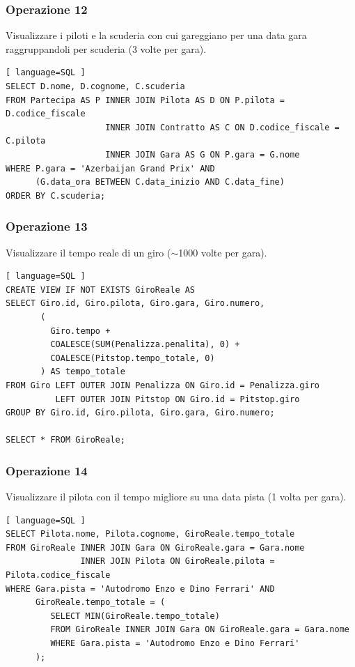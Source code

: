 \documentclass[11pt]{article}
\begin{document}
\subsubsection{Operazione 12}
Visualizzare i piloti e la scuderia con cui gareggiano per una data gara raggruppandoli per scuderia (3 volte per gara).
\begin{lstlisting}[ language=SQL ]
SELECT D.nome, D.cognome, C.scuderia
FROM Partecipa AS P INNER JOIN Pilota AS D ON P.pilota = D.codice_fiscale
                    INNER JOIN Contratto AS C ON D.codice_fiscale = C.pilota
                    INNER JOIN Gara AS G ON P.gara = G.nome
WHERE P.gara = 'Azerbaijan Grand Prix' AND
      (G.data_ora BETWEEN C.data_inizio AND C.data_fine)
ORDER BY C.scuderia;
\end{lstlisting}


\subsubsection{Operazione 13}
Visualizzare il tempo reale di un giro ($\sim$1000 volte per gara).
\begin{lstlisting}[ language=SQL ]
CREATE VIEW IF NOT EXISTS GiroReale AS
SELECT Giro.id, Giro.pilota, Giro.gara, Giro.numero, 
       (
         Giro.tempo + 
         COALESCE(SUM(Penalizza.penalita), 0) + 
         COALESCE(Pitstop.tempo_totale, 0)
       ) AS tempo_totale
FROM Giro LEFT OUTER JOIN Penalizza ON Giro.id = Penalizza.giro
          LEFT OUTER JOIN Pitstop ON Giro.id = Pitstop.giro
GROUP BY Giro.id, Giro.pilota, Giro.gara, Giro.numero;

SELECT * FROM GiroReale;
\end{lstlisting}


\subsubsection{Operazione 14}
Visualizzare il pilota con il tempo migliore su una data pista (1 volta per gara).
\begin{lstlisting}[ language=SQL ]
SELECT Pilota.nome, Pilota.cognome, GiroReale.tempo_totale
FROM GiroReale INNER JOIN Gara ON GiroReale.gara = Gara.nome
               INNER JOIN Pilota ON GiroReale.pilota = Pilota.codice_fiscale
WHERE Gara.pista = 'Autodromo Enzo e Dino Ferrari' AND
      GiroReale.tempo_totale = (
         SELECT MIN(GiroReale.tempo_totale)
         FROM GiroReale INNER JOIN Gara ON GiroReale.gara = Gara.nome
         WHERE Gara.pista = 'Autodromo Enzo e Dino Ferrari'
      );
\end{lstlisting}
\end{document}
